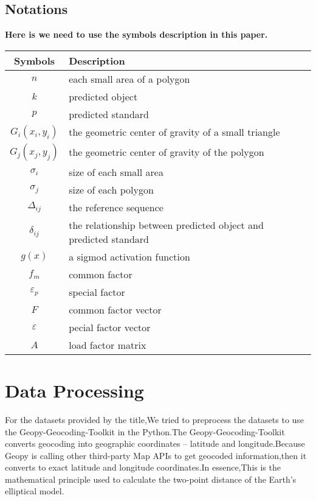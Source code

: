 \documentclass{mcmthesis}
\begin{document}
\subsection{Notations}
\textbf {Here is we need to use the symbols description in this paper.} \\ 

\begin{tabular}{cp{}}	
	\toprule
	Symbols & Description \\
	\midrule
	$n$ & each small area of a polygon \\      %
	$k$ & predicted object\\      %
	$p$ & predicted standard\\      %
	${G_i}({x_i},{y_i})$ & the geometric center of gravity of a small triangle \\ %
	${G_j}({x_j},{y_j})$ & the geometric center of gravity of the polygon \\ %
	${\sigma _i}$ & size of each small area\\  %
	${\sigma _j}$ & size of each polygon\\  %
	${\Delta _{ij}}$ & the reference sequence\\ %
	$ {\delta _{ij}} $ & the relationship between predicted object and predicted standard\\%
	$g(x)$ & a sigmod activation function \\%
	$f_m$ &  common factor\\ %
	$ {\varepsilon _p}$ &  special factor\\   %
	$F$ &  common factor vector\\ %
	$\varepsilon$ & pecial factor vector  \\ %
	$ A$ &  load factor matrix\\ %
	\bottomrule
\end{tabular}


\section{Data Processing}
For the datasets provided by the title,We tried to preprocess the datasets to use the Geopy-Geocoding-Toolkit in the Python.The Geopy-Geocoding-Toolkit
converts geocoding into geographic coordinates -- latitude and longitude.Because Geopy is calling other third-party Map APIs to get geocoded information,then it converts to exact latitude and longitude coordinates.In essence,This is the mathematical principle used to calculate the two-point distance of the Earth's elliptical model. \\
\end{document}
